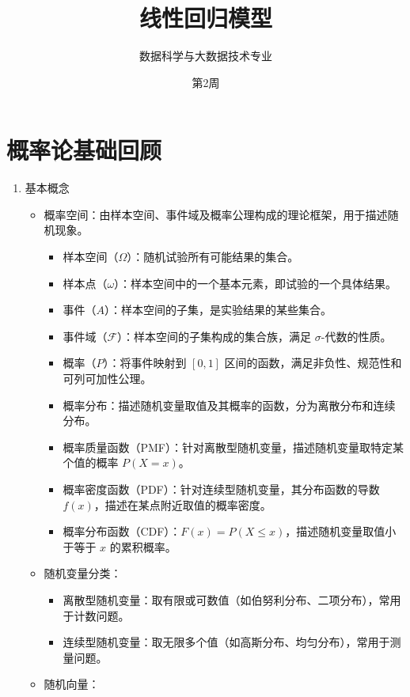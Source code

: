 \documentclass{article}
\theoremstyle{remark}
\theoremstyle{definition}
\theoremstyle{plain}
\numberwithin {equation}{section}
\numberwithin{assumption}{section}
\begin{document}
\title{线性回归模型}
\author{数据科学与大数据技术专业}
\date{第2周  }
\maketitle



\section{概率论基础回顾}

\begin{enumerate}
  \item 基本概念
    \begin{itemize}
      \item 概率空间：由样本空间、事件域及概率公理构成的理论框架，用于描述随机现象。
        \begin{itemize}
          \item 样本空间（$\Omega$）：随机试验所有可能结果的集合。
          \item 样本点（$\omega$）：样本空间中的一个基本元素，即试验的一个具体结果。
          \item 事件（$A$）：样本空间的子集，是实验结果的某些集合。
          \item 事件域（$\mathcal{F}$）：样本空间的子集构成的集合族，满足 $\sigma$-代数的性质。
          \item 概率（$P$）：将事件映射到 $[0,1]$ 区间的函数，满足非负性、规范性和可列可加性公理。
          \item 概率分布：描述随机变量取值及其概率的函数，分为离散分布和连续分布。
          \item 概率质量函数（PMF）：针对离散型随机变量，描述随机变量取特定某个值的概率 $P(X = x)$。
          \item 概率密度函数（PDF）：针对连续型随机变量，其分布函数的导数 $f(x)$，描述在某点附近取值的概率密度。
          \item 概率分布函数（CDF）：$F(x) = P(X \le x)$，描述随机变量取值小于等于 $x$ 的累积概率。
        \end{itemize}
      \item 随机变量分类：
        \begin{itemize}
          \item 离散型随机变量：取有限或可数值（如伯努利分布、二项分布），常用于计数问题。
          \item 连续型随机变量：取无限多个值（如高斯分布、均匀分布），常用于测量问题。
        \end{itemize}
      \item 随机向量：

\end{itemize}
\end{enumerate}
\end{document}
